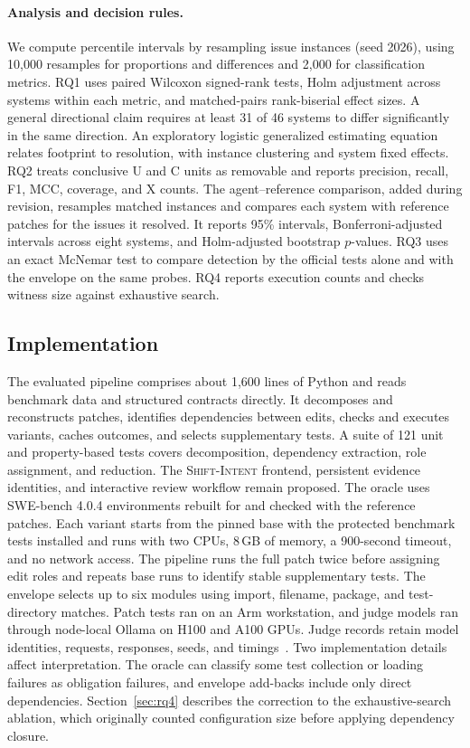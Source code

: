 \documentclass[a4paper,fleqn]{cas-sc}
\newcommand{\dsl}{\textsc{Shift-Intent}}
\newcommand{\code}[1]{\texttt{\detokenize{#1}}}
\newcommand{\lab}[1]{\textsf{#1}}
\begin{document}
\paragraph{Analysis and decision rules.} We compute percentile intervals by resampling issue instances (seed 2026), using 10,000 resamples for proportions and differences and 2,000 for classification metrics. RQ1 uses paired Wilcoxon signed-rank tests, Holm adjustment across systems within each metric, and matched-pairs rank-biserial effect sizes. A general directional claim requires at least 31 of 46 systems to differ significantly in the same direction. An exploratory logistic generalized estimating equation relates footprint to resolution, with instance clustering and system fixed effects. RQ2 treats conclusive \lab{U} and \lab{C} units as removable and reports precision, recall, F1, MCC, coverage, and \lab{X} counts. The agent--reference comparison, added during revision, resamples matched instances and compares each system with reference patches for the issues it resolved. It reports 95\% intervals, Bonferroni-adjusted intervals across eight systems, and Holm-adjusted bootstrap $p$-values. RQ3 uses an exact McNemar test to compare detection by the official tests alone and with the envelope on the same probes. RQ4 reports execution counts and checks witness size against exhaustive search.


\subsection{Implementation}\label{sec:implementation}

The evaluated pipeline comprises about 1,600 lines of Python and reads benchmark data and structured contracts directly. It decomposes and reconstructs patches, identifies dependencies between edits, checks and executes variants, caches outcomes, and selects supplementary tests. A suite of 121 unit and property-based tests covers decomposition, dependency extraction, role assignment, and reduction. The \dsl{} frontend, persistent evidence identities, and interactive review workflow remain proposed. The oracle uses SWE-bench 4.0.4 environments rebuilt for \code{linux/arm64} and checked with the reference patches. Each variant starts from the pinned base with the protected benchmark tests installed and runs with two CPUs, 8\,GB of memory, a 900-second timeout, and no network access. The pipeline runs the full patch twice before assigning edit roles and repeats base runs to identify stable supplementary tests. The envelope selects up to six modules using import, filename, package, and test-directory matches. Patch tests ran on an Arm workstation, and judge models ran through node-local Ollama on H100 and A100 GPUs. Judge records retain model identities, requests, responses, seeds, and timings~\citep{baltes2027guidelines}. Two implementation details affect interpretation. The oracle can classify some test collection or loading failures as obligation failures, and envelope add-backs include only direct dependencies. Section~\ref{sec:rq4} describes the correction to the exhaustive-search ablation, which originally counted configuration size before applying dependency closure.
\end{document}
